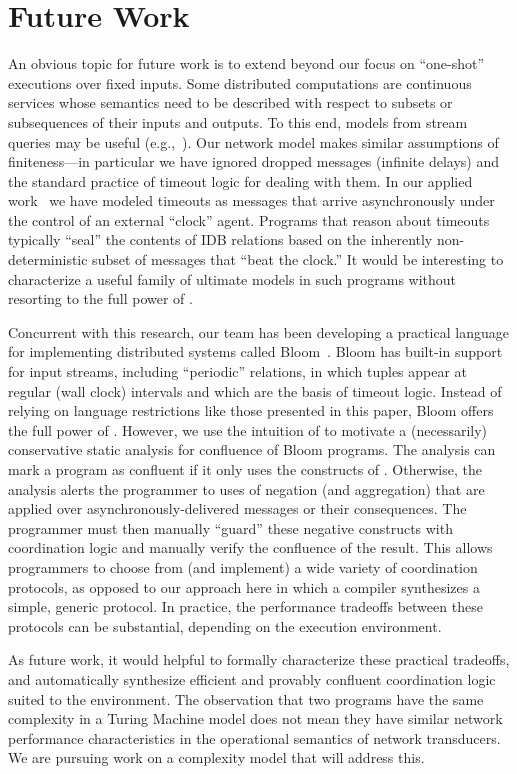 \section{Future Work}
\label{sec:conclusion}

An obvious topic for future work is to extend beyond our focus on ``one-shot'' executions over fixed inputs.  
Some distributed computations are continuous services whose semantics need to be described with respect to subsets or subsequences of their inputs and outputs.  To this end, models from stream queries may be useful (e.g.,~\cite{Chandramouli2009}).  
Our network model makes similar assumptions of finiteness---in particular we have ignored dropped messages (infinite delays) and the standard practice of timeout logic for dealing with them.  In our applied work~\cite{boom,cidr11} we have modeled timeouts as messages that arrive asynchronously under the control of an external ``clock'' agent.  Programs that reason about timeouts typically ``seal'' the contents of IDB relations based on the inherently non-deterministic subset of messages that ``beat the clock.''  It would be interesting to characterize a useful family of ultimate models in such programs without resorting to the full power of \lang.

Concurrent with this research, our team has been developing a practical language for implementing distributed
systems called Bloom~\cite{bloom}.  Bloom has built-in support for input streams, including ``periodic'' relations,
in which tuples appear at regular (wall clock) intervals and which are the basis of timeout logic.
Instead of relying on language restrictions like those presented in this paper, Bloom offers the full power of \lang.  However, we use the intuition of \plang to motivate a (necessarily) conservative static analysis for confluence of Bloom programs.  The analysis can mark a program as confluent if it only uses the constructs of \slang.  Otherwise, the analysis alerts the programmer to uses of negation (and aggregation) that are applied over asynchronously-delivered messages or their consequences.  The programmer must then manually ``guard'' these negative constructs with coordination logic and manually verify the confluence of the result.
This allows programmers to choose from (and implement) a wide variety of coordination protocols, as opposed to our approach here in which a compiler synthesizes a simple, generic protocol.  
In practice, the performance tradeoffs between these protocols can be substantial, depending on the execution environment.  

As future work, it would helpful to formally characterize these practical tradeoffs, and automatically synthesize efficient and provably confluent coordination logic suited to the environment.
The observation that two programs have the same complexity in a Turing Machine model does not mean they have similar network performance characteristics in the operational semantics of network transducers.  We are pursuing work on a complexity model that will address this.
